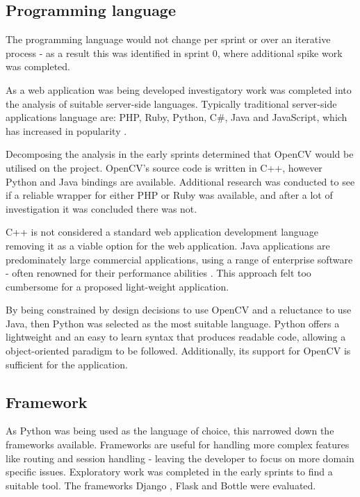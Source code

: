 \subsection{Programming language}
The programming language would not change per sprint or over an iterative process - as a result this was identified in sprint 0, where additional spike work was completed.

As a web application was being developed investigatory work was completed into the analysis of suitable server-side languages. Typically traditional server-side applications language are: PHP, Ruby, Python, C\#, Java and JavaScript, which has increased in popularity \cite{citeulike:14018462}.

Decomposing the analysis in the early sprints determined that OpenCV would be utilised on the project. OpenCV's source code is written in C++, however Python and Java bindings are available. Additional research was conducted to see if a reliable wrapper for either PHP or Ruby was available, and after a lot of investigation it was concluded there was not.

C++ is not considered a standard web application development language removing it as a viable option for the web application. Java applications are predominately large commercial applications, using a range of enterprise software - often renowned for their performance abilities \cite{citeulike:14019744}. This approach felt too cumbersome for a proposed light-weight application.

By being constrained by design decisions to use OpenCV and a reluctance to use Java, then Python was selected as the most suitable language. Python offers a lightweight and an easy to learn syntax that produces readable code, allowing a object-oriented paradigm to be followed. Additionally, its support for OpenCV is sufficient for the application.

\subsection{Framework}
As Python was being used as the language of choice, this narrowed down the frameworks available. Frameworks are useful for handling more complex features like routing and session handling - leaving the developer to focus on more domain specific issues.   Exploratory work was completed in the early sprints to find a suitable tool. The frameworks Django \cite{citeulike:14019784}, Flask \cite{citeulike:13160396} and Bottle \cite{citeulike:14019792} were evaluated.

